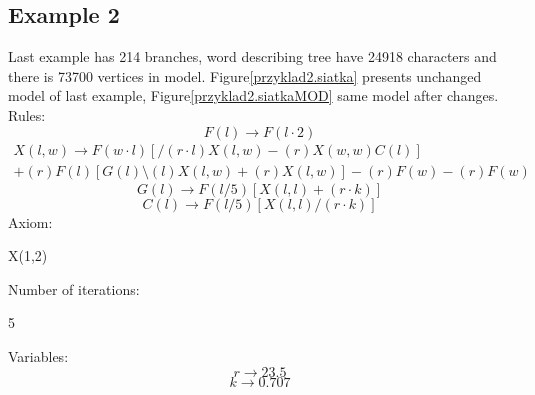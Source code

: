 \documentclass[b5paper,twoside,11pt]{article}
\renewcommand{\figurename}{Figure}
\begin{document}
\subsection*{Example 2}
Last example has 214 branches, word describing tree have 24918 characters and there is 73700 vertices in model. 
\figurename \ref{przyklad2.siatka} presents unchanged model of last example, \figurename \ref{przyklad2.siatkaMOD} same model after changes. \\
Rules: \newline
\begin{equation}
F(l)\rightarrow F(l\cdot2) 
\end{equation}
\begin{multline*}
X(l,w) \rightarrow F(w\cdot l)[/(r\cdot l)X(l,w)-(r)X(w,w)C(l)]\\
+(r)F(l)[G(l)\setminus(l)X(l,w)+(r)X(l,w)]-(r)F(w)-(r)F(w)
\end{multline*}
\begin{equation}
G(l) \rightarrow F(l/5)[X(l,l)+(r\cdot k)]
\end{equation}
\begin{equation}
C(l) \rightarrow F(l/5)[X(l,l)/(r\cdot k)]
\end{equation}
Axiom:
\begin{center}
X(1,2)
\end{center}
Number of iterations:
\begin{center}
5
\end{center}
Variables:
\begin{equation}
r\rightarrow 23.5
\end{equation}
\begin{equation}
k\rightarrow 0.707
\end{equation}
\end{document}
